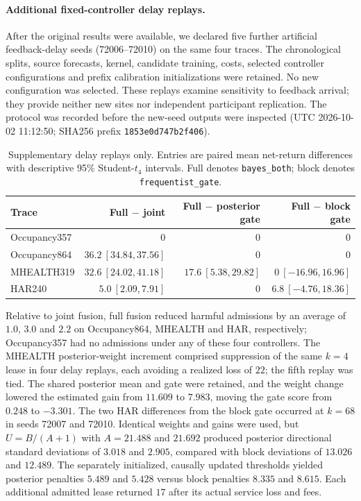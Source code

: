 \paragraph{Additional fixed-controller delay replays.}
After the original results were available, we declared five further artificial
feedback-delay seeds (72006--72010) on the same four traces. The chronological
splits, source forecasts, kernel, candidate training, costs, selected controller
configurations and prefix calibration initializations were retained. No new
configuration was selected. These replays examine sensitivity to feedback
arrival; they provide neither new sites nor independent participant replication.
The protocol was recorded before the new-seed outputs were inspected
(UTC 2026-10-02 11:12:50; SHA256 prefix \texttt{1853e0d747b2f406}).

\begin{table}[t]
\centering\small
\caption{Supplementary delay replays only. Entries are paired mean net-return
differences with descriptive 95\% Student-$t_4$ intervals. Full denotes
\texttt{bayes\_both}; block denotes \texttt{frequentist\_gate}.}
\label{tab:additional_delay_replays}
\begin{tabular}{lrrr}
\toprule
Trace & Full $-$ joint & Full $-$ posterior gate & Full $-$ block gate\\
\midrule
Occupancy357 & $0$ & $0$ & $0$\\
Occupancy864 & $36.2\ [34.84,37.56]$ & $0$ & $0$\\
MHEALTH319 & $32.6\ [24.02,41.18]$ & $17.6\ [5.38,29.82]$ & $0\ [-16.96,16.96]$\\
HAR240 & $5.0\ [2.09,7.91]$ & $0$ & $6.8\ [-4.76,18.36]$\\
\bottomrule
\end{tabular}
\end{table}

Relative to joint fusion, full fusion reduced harmful admissions by an average
of $1.0$, $3.0$ and $2.2$ on Occupancy864, MHEALTH and HAR, respectively;
Occupancy357 had no admissions under any of these four controllers.
The MHEALTH posterior-weight increment comprised suppression of the same
$k=4$ lease in four delay replays, each avoiding a realized loss of $22$;
the fifth replay was tied. The shared posterior mean and gate were retained,
and the weight change lowered the estimated gain from $11.609$ to $7.983$,
moving the gate score from $0.248$ to $-3.301$. The two HAR differences from
the block gate occurred at $k=68$ in seeds 72007 and 72010. Identical weights
and gains were used, but $U=B/(A+1)$ with $A=21.488$ and $21.692$ produced
posterior directional standard deviations of $3.018$ and $2.905$, compared
with block deviations of $13.026$ and $12.489$. The separately initialized,
causally updated thresholds yielded posterior penalties $5.489$ and $5.428$
versus block penalties $8.335$ and $8.615$. Each additional admitted lease
returned $17$ after its actual service loss and fees.

